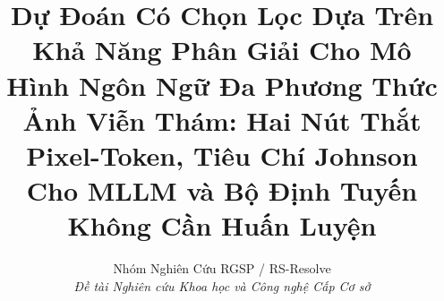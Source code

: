 \documentclass[journal,twocolumn]{IEEEtran}
\begin{document}

\title{Dự Đoán Có Chọn Lọc Dựa Trên Khả Năng Phân Giải Cho Mô Hình Ngôn Ngữ Đa Phương Thức Ảnh Viễn Thám: Hai Nút Thắt Pixel-Token, Tiêu Chí Johnson Cho MLLM và Bộ Định Tuyến Không Cần Huấn Luyện}

\author{
    Nhóm Nghiên Cứu RGSP / RS-Resolve\\
    \textit{Đề tài Nghiên cứu Khoa học và Công nghệ Cấp Cơ sở}
}

\maketitle



















\end{document}
